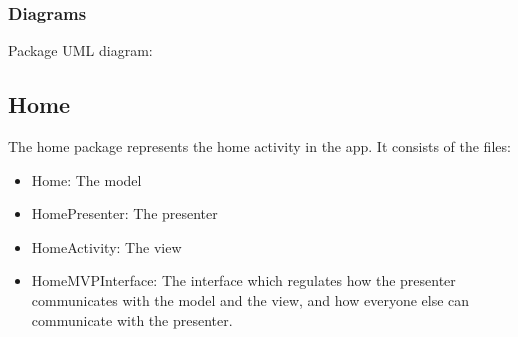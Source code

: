 \documentclass{article}
\begin{document}
\subsubsection{Diagrams}
\begin{center}
    Package UML diagram:\\
\end{center}

\subsection{Home}
The home package represents the home activity in the app. It consists of the files:
\begin{itemize}
    \item Home: The model
    \item HomePresenter: The presenter
    \item HomeActivity: The view
    \item HomeMVPInterface: The interface which regulates how the presenter communicates with the model and the view, and how everyone else can communicate with the presenter.
\end{itemize}
\end{document}
